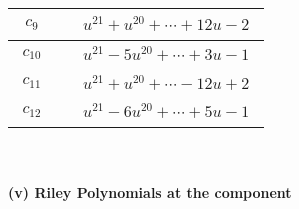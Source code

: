 \documentclass[1p]{elsarticle_modified}
\theoremstyle{definition}
\begin{document}
\begin{tabular}{m{50pt}|m{274pt}}
\hline $$\begin{aligned}c_{9}\end{aligned}$$&$\begin{aligned}
&u^{21}+u^{20}+\cdots+12 u-2
\end{aligned}$\\
\hline $$\begin{aligned}c_{10}\end{aligned}$$&$\begin{aligned}
&u^{21}-5 u^{20}+\cdots+3 u-1
\end{aligned}$\\
\hline $$\begin{aligned}c_{11}\end{aligned}$$&$\begin{aligned}
&u^{21}+u^{20}+\cdots-12 u+2
\end{aligned}$\\
\hline $$\begin{aligned}c_{12}\end{aligned}$$&$\begin{aligned}
&u^{21}-6 u^{20}+\cdots+5 u-1
\end{aligned}$\\
\hline
\end{tabular}\\~\\
\newpage\renewcommand{\arraystretch}{1}
\flushleft \textbf{(v) Riley Polynomials at the component}\newline \\
\end{document}
